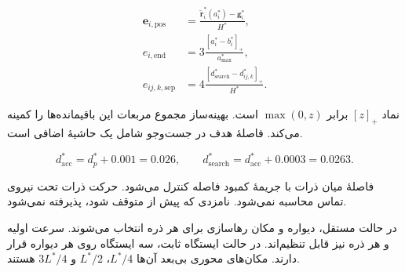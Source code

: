 \begin{equation}
\begin{aligned}
\mathbf e_{i,\mathrm{pos}} &=
 \frac{\widetilde{\mathbf r}_i^*(a_i^*)-\mathbf g_i^*}{H^*},\\
e_{i,\mathrm{end}} &=
 3\frac{[a_i^*-b_i^*]_+}{a_{\max}^*},\\
e_{ij,k,\mathrm{sep}} &=
 4\frac{[d_{\mathrm{search}}^*-d_{ij,k}^*]_+}{H^*}.
\end{aligned}
\label{eq:formation-optimization-residuals}
\end{equation}

نماد $[z]_+$ برابر $\max(0,z)$ است.
بهینه‌ساز مجموع مربعات این باقیمانده‌ها را کمینه می‌کند.
فاصلهٔ هدف در جست‌وجو شامل یک حاشیهٔ اضافی است.

\begin{equation}
d_{\mathrm{acc}}^*=d_p^*+0.001=0.026,
\qquad
d_{\mathrm{search}}^*=d_{\mathrm{acc}}^*+0.0003=0.0263.
\label{eq:formation-clearance-thresholds}
\end{equation}

فاصلهٔ میان ذرات با جریمهٔ کمبود فاصله کنترل می‌شود.
حرکت ذرات تحت نیروی تماس محاسبه نمی‌شود.
نامزدی که پیش از  متوقف شود، پذیرفته نمی‌شود.

\label{sec:formation-release-modes}

در حالت مستقل، دیواره و مکان رهاسازی برای هر ذره انتخاب می‌شوند.
سرعت اولیه و  هر ذره نیز قابل تنظیم‌اند.
در حالت ایستگاه ثابت، سه ایستگاه روی هر دیواره قرار دارند.
مکان‌های محوری بی‌بعد آن‌ها $L^*/4$، $L^*/2$ و $3L^*/4$ هستند.


